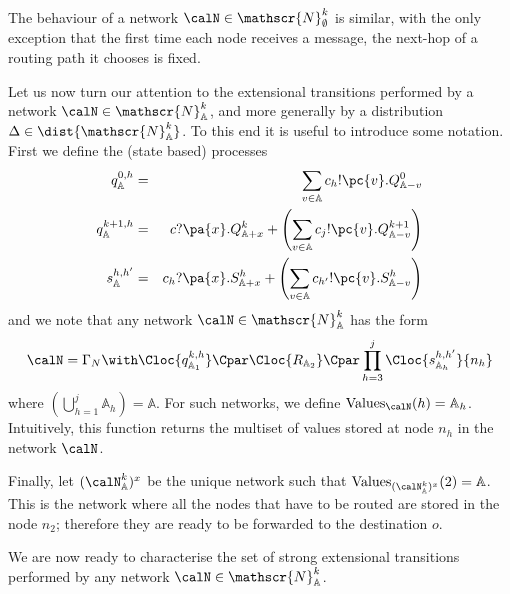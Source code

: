 \documentclass{LMCS}
\begin{document}
\noindent The behaviour of a network $\calN \in \mathscr{N}^k_{\emptyset}$ 
is similar, with the only exception that the first time 
each node receives a message, the next-hop of a routing 
path it chooses is fixed.

Let us now turn our attention to the extensional 
transitions performed by a network $\calN \in \mathscr{N}^k_{\mathbb{A}}$, 
and more generally by a distribution $\Delta \in \dist{\mathscr{N}^k_{\mathbb{A}}}$.
To this end it is useful to introduce 
some notation. 
First we define the (state based) processes
\begin{eqnarray*}
q^{0,h}_{\mathbb{A}} &=& \sum_{v \in \mathbb{A}} c_h!\pc{v}.Q^0_{\mathbb{A} - v}\\
q^{k+1,h}_{\mathbb{A}} &=& c?\pa{x}.Q^{k}_{\mathbb{A} + x} + \left(\sum_{v \in \mathbb{A}} c_j!\pc{v}.Q^{k+1}_{\mathbb{A} - v}\right)\\
s^{h,h'}_{\mathbb{A}} &=& c_h?\pa{x}.S^h_{\mathbb{A} + x} + 
\left(\sum_{v \in \mathbb{A}} c_{h'}!\pc{v}.S^h_{\mathbb{A} - v}\right) 
\end{eqnarray*}
\noindent
and we note that any network $\calN \in \mathscr{N}^k_{\mathbb{A}}$ has the form 
\[
\calN = \Gamma_{N} \with \Cloc{q^{k,h}_{\mathbb{A}_1}} \Cpar \Cloc{R_{\mathbb{A}_2}} 
\Cpar \prod_{h = 3}^j \Cloc{s^{h,h'}_{\mathbb{A}_h}}{n_h} 
\]
\noindent
where $(\bigcup_{h=1}^{j} \mathbb{A}_h) = \mathbb{A}$. 
For such networks, we define $\mbox{Values}_{\calN}(h) = \mathbb{A}_h$. 
Intuitively, this function returns the multiset of values stored at 
node $n_h$ in the network $\calN$.

Finally, let $(\calN^k_{\mathbb{A}})^{x}$ be the unique 
network such that $\mbox{Values}_{(\calN^k_{\mathbb{A}})^{x}}(2) = \mathbb{A}$.
This is the network where all the nodes that have to be routed are 
stored in the node $n_2$; therefore they are ready to be forwarded to 
the destination $o$.

We are now ready to characterise the set of strong extensional 
transitions performed by any network $\calN \in \mathscr{N}^k_{\mathbb{A}}$.
\end{document}
